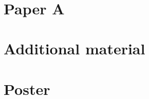 \documentclass[table]{style/USN-MSc}
\begin{document}
\USNfrontpage

\CopyRightPage

\USNtitlepage






  

 




~\nocite{*}

\cleardoublepage

\printbibliography[heading=bibintoc]


\appendix
\chapter[Paper A]{Paper A}
\label{paper-1}



\chapter[Additional material]{Additional material}
\label{extra-material}


\chapter[Poster]{Poster}
%
\end{document}
